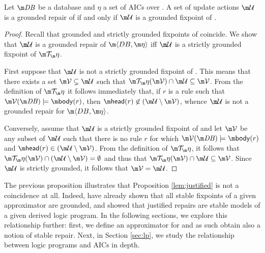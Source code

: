 \begin{proposition}
 Let $\db$ be a database and $\eta$ a set of AICs over \db. A set of update actions $\UU$ is a grounded repair of \fulldb if and only if $\UU$ is a grounded fixpoint of \Op. 
\end{proposition}
\begin{proof}
Recall that grounded and strictly grounded fixpoints of \Op coincide.
We show that $\UU$ is a grounded repair of $\fulldb$ iff $\UU$ is a strictly grounded fixpoint of $\Op$.

First suppose
that $\UU$ is not a strictly grounded fixpoint of \Op.
This means that there exists a set $\VV\subsetneq\UU$ such that $\Op(\VV)\cap\UU\subseteq\VV$.
From the definition of $\Op$ it follows immediately that, if $r$ is a rule such that $\VV(\db)\models\body(r)$, then $\head(r)\not\in(\UU\setminus\VV)$, whence $\UU$ is not a grounded repair for $\fulldb$.
 
Conversely, assume that $\UU$ is a strictly grounded fixpoint of \Op
and let $\VV$ be any subset of $\UU$ such that there is no rule $r$ for which $\VV(\db)\models\body(r)$ and $\head(r)\in(\UU\setminus\VV)$. From the definition of $\Op$, it follows that $\Op(\VV)\cap(\UU\setminus\VV)=\emptyset$ and thus that $\Op(\VV)\cap\UU\subseteq \VV$. Since $\UU$ is strictly grounded, it follows that $\VV=\UU$. 
\end{proof}

The previous proposition illustrates that Proposition \ref{lem:justified} is not a coincidence at all. 
Indeed,  have already shown that all stable fixpoints of a given approximator are grounded, and 
\citet[Theorem~6]{tplp/CaropreseT11} showed that justified repairs are stable models of a given derived logic program. 
In the following sections, we explore this relationship further: first, we define an approximator for \Op and as such obtain also a notion of stable repair. 
Next, in Section \ref{sec:lp}, we  study the relationship between logic programs and AICs in depth. 

